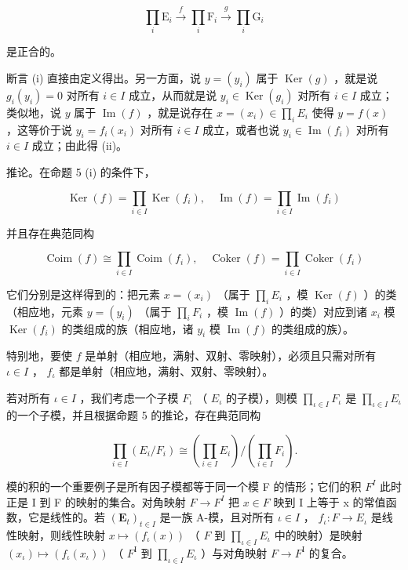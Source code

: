 \[
\prod_ {i} \mathrm{E} _ {i} \xrightarrow {f} \prod_ {i} \mathrm{F} _ {i} \xrightarrow {g} \prod_ {i} \mathrm{G} _ {i}
\]

是正合的。

断言 (i) 直接由定义得出。另一方面，说 \(y = (y_{i})\) 属于 \(\operatorname{Ker}(g)\) ，就是说 \(g_{i}(y_{i}) = 0\) 对所有 \(i \in I\) 成立，从而就是说 \(y_{i} \in \operatorname{Ker}(g_{i})\) 对所有 \(i \in I\) 成立；类似地，说 \(y\) 属于 \(\operatorname{Im}(f)\) ，就是说存在 \(x = (x_{i}) \in \prod_{i} E_{i}\) 使得 \(y = f(x)\) ，这等价于说 \(y_{i} = f_{i}(x_{i})\) 对所有 \(i \in I\) 成立，或者也说 \(y_{i} \in \operatorname{Im}(f_{i})\) 对所有 \(i \in I\) 成立；由此得 (ii)。

推论。在命题 5 (i) 的条件下，

\[
\operatorname{Ker} (f) = \prod_ {i \in I} \operatorname{Ker} (f _ {i}), \quad \operatorname{Im} (f) = \prod_ {i \in I} \operatorname{Im} (f _ {i})\tag{18}
\]

并且存在典范同构

\[
\operatorname{Coim} (f) \cong \prod_ {i \in I} \operatorname{Coim} (f _ {i}), \quad \operatorname{Coker} (f) = \prod_ {i \in I} \operatorname{Coker} (f _ {i})
\]

它们分别是这样得到的：把元素 \(x = (x_{i})\) （属于 \(\prod_{i} E_{i}\) ，模 \(\operatorname{Ker}(f)\) ）的类（相应地，元素 \(y = (y_{i})\) （属于 \(\prod_{i} F_{i}\) ，模 \(\operatorname{Im}(f)\) ）的类）对应到诸 \(x_{i}\) 模 \(\operatorname{Ker}(f_{i})\) 的类组成的族（相应地，诸 \(y_{i}\) 模 \(\operatorname{Im}(f)\) 的类组成的族）。

特别地，要使 \(f\) 是单射（相应地，满射、双射、零映射），必须且只需对所有 \(\iota \in I\) ， \(f_{\iota}\) 都是单射（相应地，满射、双射、零映射）。

若对所有 \(\iota \in I\) ，我们考虑一个子模 \(F_{\iota}\) （ \(E_{\iota}\) 的子模），则模 \(\prod_{\iota \in I} F_{\iota}\) 是 \(\prod_{\iota \in I} E_{\iota}\) 的一个子模，并且根据命题 5 的推论，存在典范同构

\[
\prod_ {i \in I} \left(E _ {i} / F _ {i}\right)\cong \left(\prod_ {i \in I} E _ {i}\right) / \left(\prod_ {i \in I} F _ {i}\right).\tag{19}
\]

模的积的一个重要例子是所有因子模都等于同一个模 F 的情形；它们的积 \(F^{I}\) 此时正是 I 到 F 的映射的集合。对角映射 \(F \rightarrow F^{I}\) 把 \(x \in F\) 映到 I 上等于 x 的常值函数，它是线性的。若 \((\mathbf{E}_{t})_{t \in I}\) 是一族 A-模，且对所有 \(\iota \in I\) ， \(f_{\iota}: F \to E_{\iota}\) 是线性映射，则线性映射 \(x \mapsto (f_{\iota}(x))\) （ \(F\) 到 \(\prod_{\iota \in I} E_{\iota}\) 中的映射）是映射 \((x_{\iota}) \mapsto (f_{\iota}(x_{\iota}))\) （ \(F^{\mathrm{I}}\) 到 \(\prod_{\iota \in I} E_{\iota}\) ）与对角映射 \(F \to F^{\mathrm{I}}\) 的复合。

